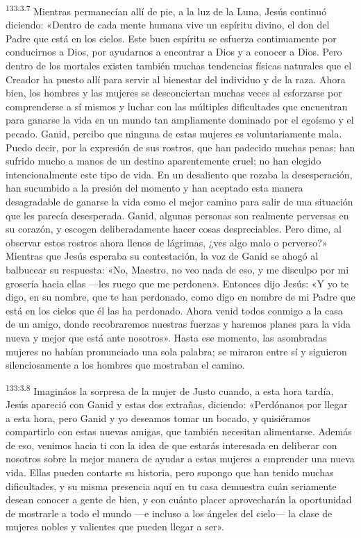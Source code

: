 \par
\textsuperscript{133:3.7} Mientras permanecían allí de pie, a la luz de la Luna, Jesús continuó diciendo: «Dentro de cada mente humana vive un espíritu divino, el don del Padre que está en los cielos. Este buen espíritu se esfuerza continuamente por conducirnos a Dios, por ayudarnos a encontrar a Dios y a conocer a Dios. Pero dentro de los mortales existen también muchas tendencias físicas naturales que el Creador ha puesto allí para servir al bienestar del individuo y de la raza. Ahora bien, los hombres y las mujeres se desconciertan muchas veces al esforzarse por comprenderse a sí mismos y luchar con las múltiples dificultades que encuentran para ganarse la vida en un mundo tan ampliamente dominado por el egoísmo y el pecado. Ganid, percibo que ninguna de estas mujeres es voluntariamente mala. Puedo decir, por la expresión de sus rostros, que han padecido muchas penas; han sufrido mucho a manos de un destino aparentemente cruel; no han elegido intencionalmente este tipo de vida. En un desaliento que rozaba la desesperación, han sucumbido a la presión del momento y han aceptado esta manera desagradable de ganarse la vida como el mejor camino para salir de una situación que les parecía desesperada. Ganid, algunas personas son realmente perversas en su corazón, y escogen deliberadamente hacer cosas despreciables. Pero dime, al observar estos rostros ahora llenos de lágrimas, ¿ves algo malo o perverso?» Mientras que Jesús esperaba su contestación, la voz de Ganid se ahogó al balbucear su respuesta: «No, Maestro, no veo nada de eso, y me disculpo por mi grosería hacia ellas ---les ruego que me perdonen». Entonces dijo Jesús: «Y yo te digo, en su nombre, que te han perdonado, como digo en nombre de mi Padre que está en los cielos que él las ha perdonado. Ahora venid todos conmigo a la casa de un amigo, donde recobraremos nuestras fuerzas y haremos planes para la vida nueva y mejor que está ante nosotros». Hasta ese momento, las asombradas mujeres no habían pronunciado una sola palabra; se miraron entre sí y siguieron silenciosamente a los hombres que mostraban el camino.

\par
\textsuperscript{133:3.8} Imagináos la sorpresa de la mujer de Justo cuando, a esta hora tardía, Jesús apareció con Ganid y estas dos extrañas, diciendo: «Perdónanos por llegar a esta hora, pero Ganid y yo deseamos tomar un bocado, y quisiéramos compartirlo con estas nuevas amigas, que también necesitan alimentarse. Además de eso, venimos hacia ti con la idea de que estarás interesada en deliberar con nosotros sobre la mejor manera de ayudar a estas mujeres a emprender una nueva vida. Ellas pueden contarte su historia, pero supongo que han tenido muchas dificultades, y su misma presencia aquí en tu casa demuestra cuán seriamente desean conocer a gente de bien, y con cuánto placer aprovecharán la oportunidad de mostrarle a todo el mundo ---e incluso a los ángeles del cielo--- la clase de mujeres nobles y valientes que pueden llegar a ser».


